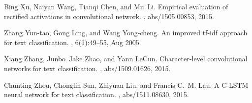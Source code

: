 \documentclass{article}
\begin{document}
\begin{thebibliography}{10}
Bing Xu, Naiyan Wang, Tianqi Chen, and Mu~Li.
\newblock Empirical evaluation of rectified activations in convolutional
  network.
, abs/1505.00853, 2015.

Zhang Yun-tao, Gong Ling, and Wang Yong-cheng.
\newblock An improved tf-idf approach for text classification.
, 6(1):49--55, Aug
  2005.

Xiang Zhang, Junbo~Jake Zhao, and Yann LeCun.
\newblock Character-level convolutional networks for text classification.
, abs/1509.01626, 2015.

Chunting Zhou, Chonglin Sun, Zhiyuan Liu, and Francis C.~M. Lau.
\newblock A {C-LSTM} neural network for text classification.
, abs/1511.08630, 2015.

\end{thebibliography}
\end{document}
